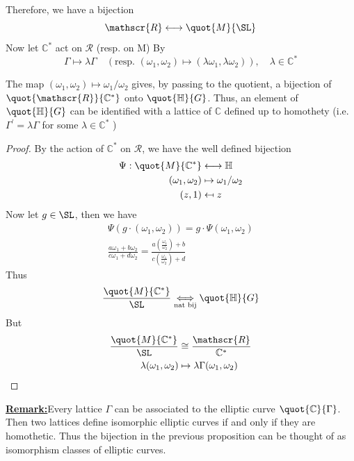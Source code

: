 \documentclass[12pt]{article}
\theoremstyle{definition}
\newenvironment{remark}[1]{\par\noindent\underline{\textbf{Remark:}}\space#1}{}
\begin{document}
Therefore, we have a bijection
\[
    \mathscr{R} \longleftrightarrow \quot{M}{\SL} 
\] 
Now let \(\mathbb{C} ^{\ast} \) act on \(\mathscr{R} \) (resp. on M) By 
\[
    \Gamma \mapsto \lambda \Gamma \quad (\textrm{resp. } (\omega _1,\omega _2) \mapsto (\lambda \omega _1,\lambda \omega _2)), \quad \lambda \in \mathbb{C} ^{\ast} 
\]  
\begin{prop}
The map \((\omega _1,\omega _2)\mapsto \omega _1/\omega _2\) gives, by passing to the quotient, a bijection of \(\quot{\mathscr{R} }{\mathbb{C} ^{\ast} } \) onto \(\quot{\mathbb{H}}{G} \). Thus, an element of \(\quot{\mathbb{H}}{G} \) can be identified with a lattice of \(\mathbb{C} \) defined up to homothety (i.e. \(\Gamma ^{\prime} = \lambda \Gamma \) for some \(\lambda \in \mathbb{C} ^{\ast} \)  )    
\end{prop}
\begin{proof}
By the action of \(\mathbb{C} ^{\ast} \) on \(\mathscr{R} \), we have the well defined bijection
\begin{align*}
\Psi: \quot{M}{\mathbb{C} ^{\ast} } &\longleftrightarrow \mathbb{H} \\
(\omega_1,\omega_2) &\mapsto \omega_1/\omega_2\\
(z,1) &\mapsfrom z 
\end{align*}   
Now let \(g\in \SL\), then we have
\begin{align*}
\Psi(g\cdot (\omega _1,\omega _2)) = g \cdot \Psi (\omega_1,\omega_2)\\
\frac{a \omega _1 + b \omega _2}{c \omega _1 + d \omega _2}  = \frac{a \left(\frac{\omega_1}{\omega_2}\right) +b }{c \left(\frac{\omega_1}{\omega_2}\right) +d}
\end{align*} 
Thus
\[
    \frac{\quot{M}{\mathbb{C}^{\ast} } }{\SL} \underset{\textrm{nat bij}}{\Longleftrightarrow} \quot{\mathbb{H} }{G} 
\]
But
\begin{align*}
    \frac{\quot{M}{\mathbb{C}^{\ast} } }{\SL} &\cong \frac{\mathscr{R} }{\mathbb{C} ^{\ast} }\\
    \lambda (\omega _1,\omega _2)&\mapsto \lambda \Gamma (\omega _1,\omega _2)
\end{align*}
\end{proof}

\begin{remark}
    Every lattice \(\Gamma \) can be associated to the elliptic curve \(\quot{\mathbb{C} }{\Gamma } \). Then two lattices define isomorphic elliptic curves if and only if they are homothetic. Thus the bijection in the previous proposition can be thought of as isomorphism classes of elliptic curves.
\end{remark}
\end{document}

